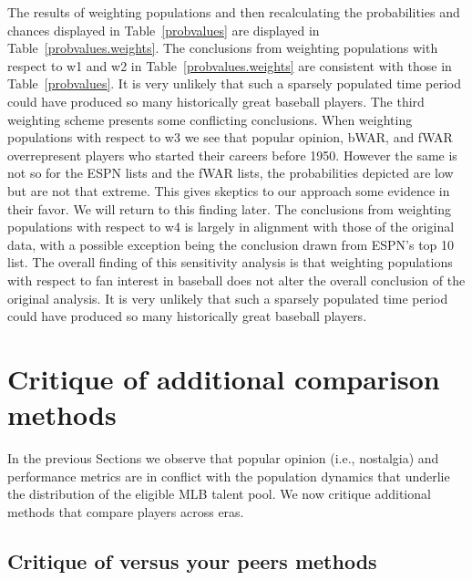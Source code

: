 \documentclass[11pt]{article}\usepackage[]{graphicx}\usepackage[]{color}
\begin{document}
The results of weighting populations and then recalculating 
the probabilities and chances displayed in Table~\ref{probvalues} 
are displayed in Table~\ref{probvalues.weights}.  The 
conclusions from weighting populations with respect to w1 and w2 in 
Table~\ref{probvalues.weights} are consistent with those in 
Table~\ref{probvalues}.  It is very unlikely that such a sparsely populated 
time period could have produced so many historically great baseball players.  
The third weighting scheme presents some conflicting conclusions.  When 
weighting populations with respect to w3 we see that popular opinion, bWAR, 
and fWAR overrepresent players who started their careers before 1950.  
However the same is not so for the ESPN lists and the fWAR lists, 
the probabilities depicted are low but are not that extreme.  
This gives skeptics to our approach some evidence in their favor.  
We will return to this finding later.  The conclusions from weighting 
populations with respect to w4 is largely in alignment with those of the 
original data, with a possible exception being the conclusion drawn from 
ESPN's top 10 list.  The overall finding of this sensitivity analysis is 
that weighting populations with respect to fan interest in baseball does 
not alter the overall conclusion of the original analysis.  It is very 
unlikely that such a sparsely populated time period could have produced 
so many historically great baseball players.  





\section{Critique of additional comparison methods}

In the previous Sections we observe that popular opinion (i.e., nostalgia) 
and performance metrics are in conflict with the population dynamics that 
underlie the distribution of the eligible MLB talent pool.  
We now critique additional methods that compare players across eras.  



\subsection{Critique of versus your peers methods}
\label{WARcritique}
\end{document}
